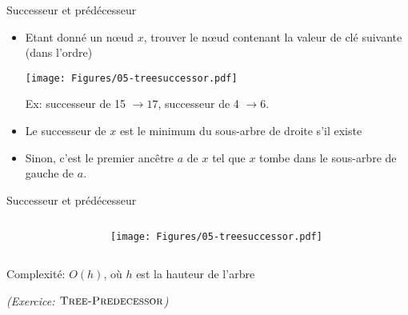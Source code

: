 \begin{frame}{Successeur et prédécesseur}
\begin{itemize}
\item Etant donné un n\oe ud $x$, trouver le n\oe ud contenant la valeur de clé suivante (dans l'ordre)

\begin{center}
\texttt{[image: Figures/05-treesuccessor.pdf]}

\bigskip

Ex: successeur de 15 $\rightarrow 17$, successeur de 4 $\rightarrow 6$.
\end{center}


\item Le successeur de $x$ est le minimum du sous-arbre de droite s'il existe
\item Sinon, c'est le premier ancêtre $a$ de $x$ tel que $x$ tombe dans le sous-arbre de gauche de $a$.
\end{itemize}
\end{frame}

\begin{frame}{Successeur et prédécesseur}

\begin{columns}
\begin{column}{5cm}
\begin{center}
\begin{small}
\end{small}
\end{center}
\end{column}
\begin{column}{5cm}
\begin{center}

  \bigskip

\bigskip

\texttt{[image: Figures/05-treesuccessor.pdf]}
\end{center}
\end{column}
\end{columns}

\bigskip

Complexité: $O(h)$, où $h$ est la hauteur de l'arbre

\bigskip

\emph{(Exercice: $\textnormal{\scshape Tree-Predecessor}$)}


\end{frame}

